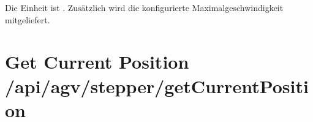 \documentclass[letterpaper,10pt,english]{sphinxmanual}
\begin{document}
\sphinxAtStartPar
Die Einheit ist . Zusätzlich wird die konfigurierte Maximalgeschwindigkeit mitgeliefert.

\sphinxAtStartPar
{}

\begin{sphinxVerbatim}[commandchars=\\\{\}]
\end{sphinxVerbatim}


\section{Get Current Position \textendash{} /api/agv/stepper/getCurrentPosition}
\label{\detokenize{agv_rest_api_stepper:get-current-position-api-agv-stepper-getcurrentposition}}\label{\detokenize{agv_rest_api_stepper:get-api-agv-stepper-getcurrentposition}}
\end{document}
